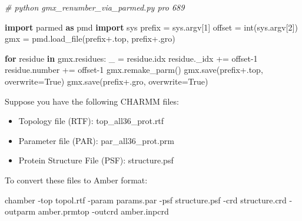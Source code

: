 \documentclass[
]{article}
\newenvironment{Shaded}{}{}
\newcommand{\AttributeTok}[1]{\textcolor[rgb]{0.49,0.56,0.16}{#1}}
\newcommand{\BuiltInTok}[1]{\textcolor[rgb]{0.00,0.50,0.00}{#1}}
\newcommand{\CommentTok}[1]{\textcolor[rgb]{0.38,0.63,0.69}{\textit{#1}}}
\newcommand{\ControlFlowTok}[1]{\textcolor[rgb]{0.00,0.44,0.13}{\textbf{#1}}}
\newcommand{\DecValTok}[1]{\textcolor[rgb]{0.25,0.63,0.44}{#1}}
\newcommand{\ExtensionTok}[1]{#1}
\newcommand{\ImportTok}[1]{\textcolor[rgb]{0.00,0.50,0.00}{\textbf{#1}}}
\newcommand{\KeywordTok}[1]{\textcolor[rgb]{0.00,0.44,0.13}{\textbf{#1}}}
\newcommand{\NormalTok}[1]{#1}
\newcommand{\OperatorTok}[1]{\textcolor[rgb]{0.40,0.40,0.40}{#1}}
\newcommand{\StringTok}[1]{\textcolor[rgb]{0.25,0.44,0.63}{#1}}
\newcommand{\VariableTok}[1]{\textcolor[rgb]{0.10,0.09,0.49}{#1}}
\begin{document}
\begin{Shaded}
\begin{Highlighting}[]
\CommentTok{\# python gmx\_renumber\_via\_parmed.py pro 689}

\ImportTok{import}\NormalTok{ parmed }\ImportTok{as}\NormalTok{ pmd }
\ImportTok{import}\NormalTok{ sys}
\NormalTok{prefix }\OperatorTok{=}\NormalTok{ sys.argv[}\DecValTok{1}\NormalTok{]}
\NormalTok{offset }\OperatorTok{=} \BuiltInTok{int}\NormalTok{(sys.argv[}\DecValTok{2}\NormalTok{])}
\NormalTok{gmx }\OperatorTok{=}\NormalTok{ pmd.load\_file(prefix}\OperatorTok{+}\StringTok{\textquotesingle{}.top\textquotesingle{}}\NormalTok{, prefix}\OperatorTok{+}\StringTok{\textquotesingle{}.gro\textquotesingle{}}\NormalTok{)}

\ControlFlowTok{for}\NormalTok{ residue }\KeywordTok{in}\NormalTok{ gmx.residues:}
\NormalTok{    \_ }\OperatorTok{=}\NormalTok{ residue.idx}
\NormalTok{    residue.\_idx }\OperatorTok{+=}\NormalTok{ offset}\OperatorTok{{-}}\DecValTok{1}
\NormalTok{    residue.number }\OperatorTok{+=}\NormalTok{ offset}\OperatorTok{{-}}\DecValTok{1}
\NormalTok{gmx.remake\_parm()}
\NormalTok{gmx.save(prefix}\OperatorTok{+}\StringTok{\textquotesingle{}.top\textquotesingle{}}\NormalTok{, overwrite}\OperatorTok{=}\VariableTok{True}\NormalTok{)}
\NormalTok{gmx.save(prefix}\OperatorTok{+}\StringTok{\textquotesingle{}.gro\textquotesingle{}}\NormalTok{, overwrite}\OperatorTok{=}\VariableTok{True}\NormalTok{)}
\end{Highlighting}
\end{Shaded}

Suppose you have the following CHARMM files:

\begin{itemize}
\item
  Topology file (RTF): top\_all36\_prot.rtf
\item
  Parameter file (PAR): par\_all36\_prot.prm
\item
  Protein Structure File (PSF): structure.psf
\end{itemize}

To convert these files to Amber format:

\begin{Shaded}
\begin{Highlighting}[]
\ExtensionTok{chamber} \AttributeTok{{-}top}\NormalTok{ topol.rtf }\AttributeTok{{-}param}\NormalTok{ params.par }\AttributeTok{{-}psf}\NormalTok{ structure.psf }\AttributeTok{{-}crd}\NormalTok{ structure.crd }\AttributeTok{{-}outparm}\NormalTok{ amber.prmtop }\AttributeTok{{-}outcrd}\NormalTok{ amber.inpcrd}
\end{Highlighting}
\end{Shaded}
\end{document}
